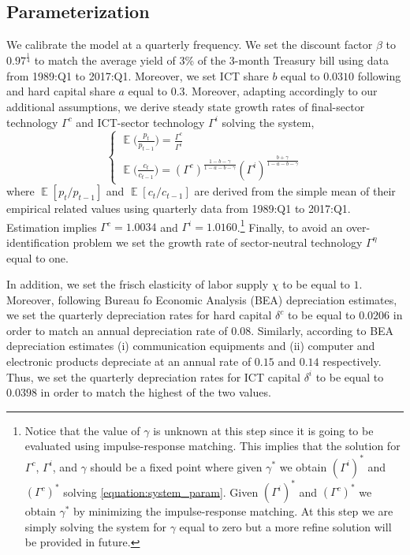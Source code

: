 \documentclass[12pt]{article}
\DeclareMathOperator{\E}{\mathbb{E}}
\begin{document}
\subsection{Parameterization}\label{section:parameterization}

We calibrate the model at a quarterly frequency. We set the discount factor $\beta$ to $0.97^{\frac{1}{4}}$ to match the average yield of $3$\% of the 3-month Treasury bill using data from 1989:Q1 to 2017:Q1. Moreover, we set ICT share $b$ equal to $0.0310$ following \cite{oulton2012long} and hard capital share $a$ equal to $0.3$. Moreover, adapting \cite{oulton2012long} accordingly to our additional assumptions, we derive steady state growth rates of final-sector technology $\Gamma^c$ and ICT-sector technology $\Gamma^i$ solving the system,
\begin{equation}\label{equation:system_param}
\begin{cases}
\E \big( \frac{p_t}{p_{t-1}} \big) = \frac{\Gamma^c}{\Gamma^i} \\
\E \big( \frac{c_t}{c_{t-1}} \big) = (\Gamma^c)^{\frac{1-b-\gamma}{1-a-b-\gamma}}  (\Gamma^i)^{\frac{b+\gamma}{1-a-b-\gamma}}
\end{cases}
\end{equation}
where $\E[p_t/p_{t-1}]$ and $\E[c_t/c_{t-1}]$ are derived from the simple mean of their empirical related values using quarterly data from 1989:Q1 to 2017:Q1. Estimation implies $\Gamma^c = 1.0034$ and $\Gamma^i = 1.0160$.\footnote{Notice that the value of $\gamma$ is unknown at this step since it is going to be evaluated using impulse-response matching. This implies that the solution for $\Gamma^c$, $\Gamma^i$, and $\gamma$ should be a fixed point where given $\gamma^*$ we obtain $(\Gamma^i)^*$ and $(\Gamma^c)^*$ solving \ref{equation:system_param}. Given $(\Gamma^i)^*$ and $(\Gamma^c)^*$ we obtain $\gamma^*$ by minimizing the impulse-response matching. At this step we are simply solving the system for $\gamma$ equal to zero but a more refine solution will be provided in future.} Finally, to avoid an over-identification problem we set the growth rate of sector-neutral technology $\Gamma^{\eta}$ equal to one.

In addition, we set the frisch elasticity of labor supply $\chi$ to be equal to $1$. Moreover, following Bureau fo Economic Analysis (BEA) depreciation estimates, we set the quarterly depreciation rates for hard capital $\delta^c$ to be equal to $0.0206$ in order to match an annual depreciation rate of $0.08$. Similarly, according to BEA depreciation estimates (i) communication equipments and (ii) computer and electronic products depreciate at an annual rate of $0.15$ and $0.14$ respectively. Thus, we set the quarterly depreciation rates for ICT capital $\delta^i$ to be equal to $0.0398$ in order to match the highest of the two values.
\end{document}
